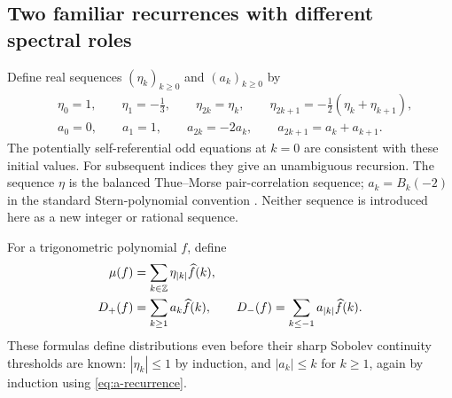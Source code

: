 \documentclass[11pt,a4paper]{article}
\theoremstyle{definition}
\theoremstyle{remark}
\newcommand{\Z}{\mathbb Z}
\numberwithin{equation}{section}
\begin{document}
\subsection{Two familiar recurrences with different spectral roles}
Define real sequences $(\eta_k)_{k\ge0}$ and $(a_k)_{k\ge0}$ by
\begin{align}
 &\eta_0=1,\qquad \eta_1=-\tfrac13,\qquad
 \eta_{2k}=\eta_k,\qquad
 \eta_{2k+1}=-\tfrac12(\eta_k+\eta_{k+1}),
 \label{eq:eta-recurrence}\\
 &a_0=0,\qquad a_1=1,\qquad
 a_{2k}=-2a_k,\qquad a_{2k+1}=a_k+a_{k+1}.
 \label{eq:a-recurrence}
\end{align}
The potentially self-referential odd equations at $k=0$ are consistent
with these initial values. For subsequent indices they give an unambiguous
recursion. The sequence $\eta$ is the balanced Thue--Morse pair-correlation
sequence; $a_k=B_k(-2)$ in the standard Stern-polynomial convention
\cite{baake-coons,ulas-ulas}. Neither sequence is introduced here as a new
integer or rational sequence.

For a trigonometric polynomial $f$, define
\begin{align}
 \mu(f)&=\sum_{k\in\Z}\eta_{|k|}\widehat f(k),\notag\\
 D_+(f)&=\sum_{k\ge1}a_k\widehat f(k),\qquad
 D_-(f)=\sum_{k\le-1}a_{|k|}\widehat f(k).
 \label{eq:dual-functionals}
\end{align}
These formulas define distributions even before their sharp Sobolev
continuity thresholds are known: $|\eta_k|\le1$ by induction, and
$|a_k|\le k$ for $k\ge1$, again by induction using
\eqref{eq:a-recurrence}.
\end{document}
